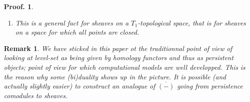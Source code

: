 \documentclass[a4paper, english, 11pt]{article}
\newcommand{\kk}[0]{\textbf{k}}
\newcommand{\0}{\vec{0}}
\newcommand{\Hom}[0]{\text{Hom}}
\newtheorem*{pf}{Proof.} }
\newtheorem{remark}[prop]{Remark}
\begin{document}
\begin{pf}
\begin{enumerate}
     
     Now if $\varprojlim\limits_{]-x;y[\ni \alpha}M((x,y))$ is finite dimensional then the above product in the right hand side of~\eqref{eq:porjlimM} is a finite product and thus a direct sum: 
     $\prod_{\substack{I\in \mathbb{B}(M\circ G)\\ 0 \in \text{closure}(I)}} \kk \; \simeq \; \bigoplus_{\substack{I\in \mathbb{B}(M\circ G)\\ 0 \in \text{closure}(I)}}.$ Therefore we have 
     \begin{align*}
        \varprojlim_{]-x;y[\ni \alpha}M((x,y))%
        & \simeq \bigoplus_{\substack{I\in \mathbb{B}(M\circ G)\\ 0 \in \text{closure}(I)}} \kk  \\
        &\simeq \varprojlim_{]-x;y[\ni \alpha} \Hom \left ( M((x,y)), \kk \right ) \; \text{ (by~\eqref{eq:DefMoG} and finite dimensionality)}\\ 
        &\simeq \tilde{M}_\alpha \; \text{ (by~\eqref{eq:defMtilde})}\\
        &\simeq \overline{M}_\alpha.
    \end{align*}
    \item This is a general fact for sheaves on a $T_1$-topological space, that is for sheaves on a space for which all   points are closed.
\end{enumerate}
\end{pf}
\begin{remark} We have sticked in this paper ot the traditionnal point of view of looking at level-set as being given by homology functors and thus as persistent objects; point of view for which computational models are well developped. This is the reason why some (bi)duality shows up in the picture. It is possible (and actually slightly easier) to construct an analogue of $\overline{(-)}$ going from persistence comodules to sheaves.
\end{remark}
\end{document}
